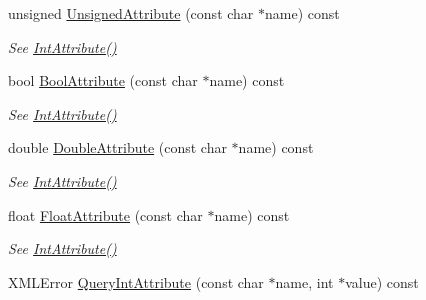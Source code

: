 \begin{DoxyCompactItemize}
\item 
\mbox{\label{classtinyxml2_1_1XMLElement_a2a1daf6b090f53f5d34bcc71c646ea78}} 
unsigned \hyperlink{classtinyxml2_1_1XMLElement_a2a1daf6b090f53f5d34bcc71c646ea78}{Unsigned\+Attribute} (const char $\ast$name) const
\begin{DoxyCompactList}\small\item\em See \hyperlink{classtinyxml2_1_1XMLElement_acfaaeeadf0b0dbe56bb0f5ec12cb7736}{Int\+Attribute()} \end{DoxyCompactList}\item 
\mbox{\label{classtinyxml2_1_1XMLElement_a07f6033f25eab7b246b57f4bff0758be}} 
bool \hyperlink{classtinyxml2_1_1XMLElement_a07f6033f25eab7b246b57f4bff0758be}{Bool\+Attribute} (const char $\ast$name) const
\begin{DoxyCompactList}\small\item\em See \hyperlink{classtinyxml2_1_1XMLElement_acfaaeeadf0b0dbe56bb0f5ec12cb7736}{Int\+Attribute()} \end{DoxyCompactList}\item 
\mbox{\label{classtinyxml2_1_1XMLElement_a8948baa30b3a557d5ad84e7ab6d445fe}} 
double \hyperlink{classtinyxml2_1_1XMLElement_a8948baa30b3a557d5ad84e7ab6d445fe}{Double\+Attribute} (const char $\ast$name) const
\begin{DoxyCompactList}\small\item\em See \hyperlink{classtinyxml2_1_1XMLElement_acfaaeeadf0b0dbe56bb0f5ec12cb7736}{Int\+Attribute()} \end{DoxyCompactList}\item 
\mbox{\label{classtinyxml2_1_1XMLElement_a69cf755f05fc76a320eb10770845ad8f}} 
float \hyperlink{classtinyxml2_1_1XMLElement_a69cf755f05fc76a320eb10770845ad8f}{Float\+Attribute} (const char $\ast$name) const
\begin{DoxyCompactList}\small\item\em See \hyperlink{classtinyxml2_1_1XMLElement_acfaaeeadf0b0dbe56bb0f5ec12cb7736}{Int\+Attribute()} \end{DoxyCompactList}\item 
X\+M\+L\+Error \hyperlink{classtinyxml2_1_1XMLElement_a8a78bc1187c1c45ad89f2690eab567b1}{Query\+Int\+Attribute} (const char $\ast$name, int $\ast$value) const

\end{DoxyCompactItemize}
